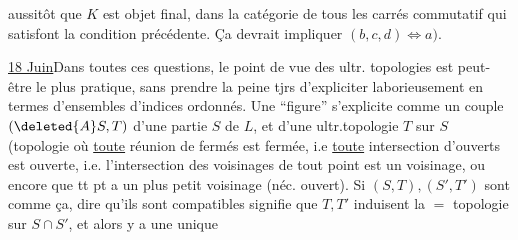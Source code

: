 aussitôt que $K$ est objet final, dans la catégorie de tous les carrés commutatif
  qui satisfont la condition précédente. Ça devrait impliquer $(b,c,d)\Longleftrightarrow a)$.

\uline{18 Juin}\quad Dans toutes ces questions, le point de vue des ultr. topologies  est peut-être le plus pratique, sans prendre la peine tjrs d'expliciter laborieusement en termes d'ensembles d'indices ordonnés. Une ``figure''  s'explicite comme un couple $(\deleted{A}S,T)$ d'une partie $S$ de $L$, et d'une ultr.topologie $T$ sur $S$ (topologie où \uline{toute} réunion de fermés est fermée, i.e \uline{toute} intersection d'ouverts est ouverte, i.e. l'intersection des voisinages  de tout point est un voisinage, ou encore que tt pt a un plus petit voisinage (néc. ouvert). Si $(S,T),(S',T')$ sont comme ça, dire qu'ils sont compatibles signifie que $T,T'$ induisent la $=$ topologie sur $S\cap S'$,  et alors y a une unique
